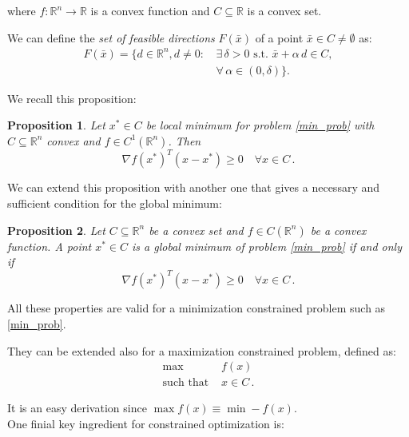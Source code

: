 \documentclass[10pt,twocolumn,letterpaper, english]{article}
\theoremstyle{definition}
\theoremstyle{plain}
\theoremstyle{plain}
\theoremstyle{plain}
\theoremstyle{plain}
\newtheorem{prop}{Proposition}[subsection]
\theoremstyle{remark}
\theoremstyle{remark}
\theoremstyle{definition}
\theoremstyle{definition}
\theoremstyle{definition}
\theoremstyle{definition}
\begin{document}
\noindent where $f: \mathbb{R}^n \to \mathbb{R}$ is a convex function and $C \subseteq \mathbb{R}$ is a convex set.

We can define the \textit{set of feasible directions} $F(\bar{x})$ of a point $\bar{x} \in C \ne \emptyset$ as: 
\begin{align}
    F(\bar{x}) = \{ d \in \mathbb{R}^n, d \ne 0:\, &\exists \, \delta > 0 \text{ s.t. } \bar{x} + \alpha\, d \in C, \\ &\forall\, \alpha \in (0, \delta) \} . \nonumber
\end{align}

\noindent We recall this proposition: 

\begin{prop}
 Let $x^* \in C$ be local minimum for problem \ref{min_prob} with $C \subseteq \mathbb{R}^n$ convex and $f \in C^1(\mathbb{R}^n)$. Then 
\begin{equation}
    \label{ineq}
    \nabla f(x^*)^T (x - x^*) \ge 0 \quad \forall x \in C \,. 
\end{equation}

\end{prop}


We can extend this proposition with another one that gives a necessary and sufficient condition for the global minimum: 

\begin{prop}
Let $C \subseteq \mathbb{R}^n$ be a convex set and $f \in C(\mathbb{R}^n)$ be a convex function. A point $x^* \in C$ is a \textit{global minimum} of problem \ref{min_prob} if and only if 
\begin{equation*}
    \nabla f(x^*)^T (x - x^*) \ge 0 \quad \forall x \in C \,. 
\end{equation*}
\end{prop}

All these properties are valid for a minimization constrained problem such as \ref{min_prob}. 

They can be extended also for a maximization constrained problem, defined as: 
\begin{align*}
    \max\, &f(x) \\
    \text{such that } &x \in C \,.
\end{align*}

It is an easy derivation since $\max f(x) \equiv \min -f(x)$. \\

One finial key ingredient for constrained optimization is:\\
\end{document}
